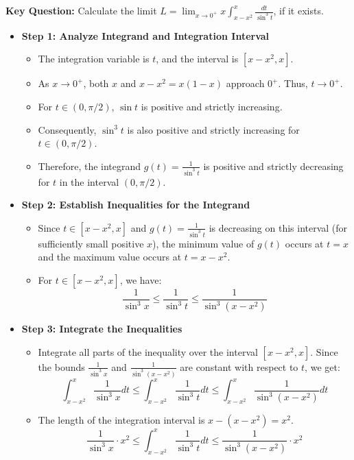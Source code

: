 \begin{cascade}
	\textbf{Key Question:} Calculate the limit $L = \lim_{x \to 0^+} x \int_{x-x^2}^x \frac{dt}{\sin^3 t}$, if it exists.
	\begin{itemize}
		\item \textbf{Step 1: Analyze Integrand and Integration Interval}
		      \begin{itemize}
			      \item The integration variable is $t$, and the interval is $[x-x^2, x]$.
			      \item As $x \to 0^+$, both $x$ and $x-x^2 = x(1-x)$ approach $0^+$. Thus, $t \to 0^+$.
			      \item For $t \in (0, \pi/2)$, $\sin t$ is positive and strictly increasing.
			      \item Consequently, $\sin^3 t$ is also positive and strictly increasing for $t \in (0, \pi/2)$.
			      \item Therefore, the integrand $g(t) = \frac{1}{\sin^3 t}$ is positive and strictly decreasing for $t$ in the interval $(0, \pi/2)$.
		      \end{itemize}
		\item \textbf{Step 2: Establish Inequalities for the Integrand}
		      \begin{itemize}
			      \item Since $t \in [x-x^2, x]$ and $g(t) = \frac{1}{\sin^3 t}$ is decreasing on this interval (for sufficiently small positive $x$), the minimum value of $g(t)$ occurs at $t=x$ and the maximum value occurs at $t=x-x^2$.
			      \item For $t \in [x-x^2, x]$, we have:
			            \[ \frac{1}{\sin^3 x} \le \frac{1}{\sin^3 t} \le \frac{1}{\sin^3(x-x^2)} \]
		      \end{itemize}
		\item \textbf{Step 3: Integrate the Inequalities}
		      \begin{itemize}
			      \item Integrate all parts of the inequality over the interval $[x-x^2, x]$. Since the bounds $\frac{1}{\sin^3 x}$ and $\frac{1}{\sin^3(x-x^2)}$ are constant with respect to $t$, we get:
			            \[ \int_{x-x^2}^x \frac{1}{\sin^3 x} dt \le \int_{x-x^2}^x \frac{1}{\sin^3 t} dt \le \int_{x-x^2}^x \frac{1}{\sin^3(x-x^2)} dt \]
			      \item The length of the integration interval is $x - (x-x^2) = x^2$.
			            \[ \frac{1}{\sin^3 x} \cdot x^2 \le \int_{x-x^2}^x \frac{1}{\sin^3 t} dt \le \frac{1}{\sin^3(x-x^2)} \cdot x^2 \]

\end{itemize}
\end{itemize}
\end{cascade}
